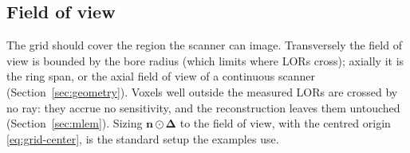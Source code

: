 \subsection{Field of view}
\label{sec:grid:fov}

The grid should cover the region the scanner can image. Transversely the field
of view is bounded by the bore radius (which limits where LORs cross); axially it
is the ring span, or the axial field of view of a continuous scanner
(Section~\ref{sec:geometry}). Voxels well outside the measured LORs are crossed
by no ray: they accrue no sensitivity, and the reconstruction leaves them
untouched (Section~\ref{sec:mlem}). Sizing $\bm{n}\odot\bm{\Delta}$ to the field
of view, with the centred origin \eqref{eq:grid-center}, is the standard setup
the examples use.

